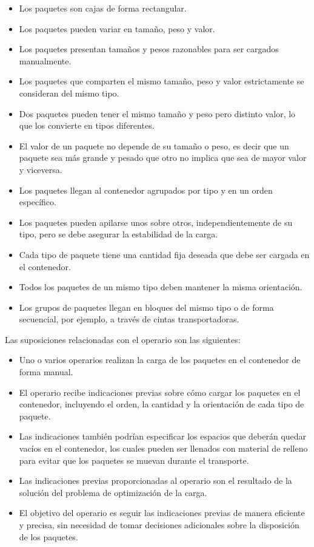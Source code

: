 \documentclass[openany]{article}
\begin{document}
\begin{itemize}
    \item Los paquetes son cajas de forma rectangular.
    \item Los paquetes pueden variar en tamaño, peso y valor.
    \item Los paquetes presentan tamaños y pesos razonables para ser cargados manualmente.
    \item Los paquetes que comparten el mismo tamaño, peso y valor estrictamente se consideran del mismo tipo.
    \item Dos paquetes pueden tener el mismo tamaño y peso pero distinto valor, lo que los convierte en tipos diferentes.
    \item El valor de un paquete no depende de su tamaño o peso, es decir que un paquete sea más grande y pesado que otro no implica que sea de mayor valor y viceversa.
    \item Los paquetes llegan al contenedor agrupados por tipo y en un orden específico.
    \item Los paquetes pueden apilarse unos sobre otros, independientemente de su tipo, pero se debe asegurar la estabilidad de la carga.
    \item Cada tipo de paquete tiene una cantidad fija deseada que debe ser cargada en el contenedor.
    \item Todos los paquetes de un mismo tipo deben mantener la misma orientación.
    \item Los grupos de paquetes llegan en bloques del mismo tipo o de forma secuencial, por ejemplo, a través de cintas transportadoras.
\end{itemize}

Las suposiciones relacionadas con el operario son las siguientes:

\begin{itemize}
    \item Uno o varios operarios realizan la carga de los paquetes en el contenedor de forma manual.
    \item El operario recibe indicaciones previas sobre cómo cargar los paquetes en el contenedor, incluyendo el orden, la cantidad y la orientación de cada tipo de paquete.
    \item Las indicaciones también podrían especificar los espacios que deberán quedar vacíos en el contenedor, los cuales pueden ser llenados con material de relleno para evitar que los paquetes se muevan durante el transporte.
    \item Las indicaciones previas proporcionadas al operario son el resultado de la solución del problema de optimización de la carga.
    \item El objetivo del operario es seguir las indicaciones previas de manera eficiente y precisa, sin necesidad de tomar decisiones adicionales sobre la disposición de los paquetes.
\end{itemize}
\end{document}
